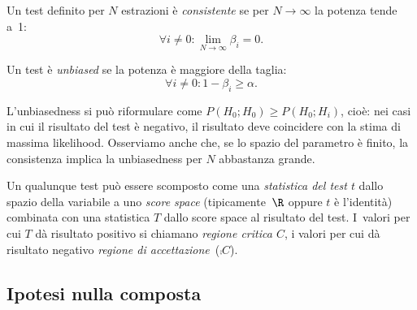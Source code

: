 \begin{definition}[Consistenza]
	Un test definito per $N$ estrazioni è \emph{consistente}
	se per $N\to\infty$ la potenza tende a~1:
	\begin{equation*}
		\forall i\neq0:
		\lim_{N\to\infty} \beta_i = 0.
	\end{equation*}
\end{definition}

\begin{definition}[Unbiasedness]
	Un test è \emph{unbiased}
	se la potenza è maggiore della taglia:
	\begin{equation*}
		\forall i\neq0:
		1-\beta_i \ge \alpha.
	\end{equation*}
\end{definition}

L'unbiasedness si può riformulare come $P(H_0;H_0)\ge P(H_0;H_i)$,
cioè: nei casi in cui il risultato del test è negativo,
il risultato deve coincidere con la stima di massima likelihood.
Osserviamo anche che,
se lo spazio del parametro è finito,
la consistenza implica la unbiasedness per $N$ abbastanza grande.

\begin{definition}	
	Un qualunque test può essere scomposto come una \emph{statistica del test $t$}
	dallo spazio della variabile a uno \emph{score space} (tipicamente~$\R$ oppure $t$ è l'identità)
	combinata con una statistica $T$ dallo score space al risultato del test.
	I~valori per cui $T$ dà risultato positivo si chiamano \emph{regione critica $C$},
	i valori per cui dà risultato negativo \emph{regione di accettazione}~($\comp C$).
\end{definition}

\subsection{Ipotesi nulla composta}

